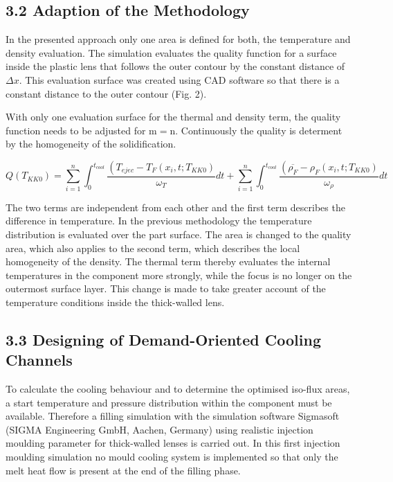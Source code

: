 \documentclass[10pt]{article}
\begin{document}
\subsection*{3.2 Adaption of the Methodology}
In the presented approach only one area is defined for both, the temperature and density evaluation. The simulation evaluates the quality function for a surface inside the plastic lens that follows the outer contour by the constant distance of $\Delta x$. This evaluation surface was created using CAD software so that there is a constant distance to the outer contour (Fig. 2).

With only one evaluation surface for the thermal and density term, the quality function needs to be adjusted for $\mathrm{m}=\mathrm{n}$. Continuously the quality is determent by the homogeneity of the solidification.


\begin{equation*}
Q\left(T_{K K 0}\right)=\sum_{i=1}^{n} \int_{0}^{t_{c o o l}} \frac{\left(T_{e j e c}-T_{F}\left(x_{i}, t ; T_{K K 0}\right)\right.}{\omega_{T}} d t+\sum_{i=1}^{n} \int_{0}^{t_{c o o l}} \frac{\left(\overline{\rho_{F}}-\rho_{F}\left(x_{i}, t ; T_{K K 0}\right)\right.}{\omega_{\rho}} d t \tag{3}
\end{equation*}


The two terms are independent from each other and the first term describes the difference in temperature. In the previous methodology the temperature distribution is evaluated over the part surface. The area is changed to the quality area, which also applies to the second term, which describes the local homogeneity of the density. The thermal term thereby evaluates the internal temperatures in the component more strongly, while the focus is no longer on the outermost surface layer. This change is made to take greater account of the temperature conditions inside the thick-walled lens.

\subsection*{3.3 Designing of Demand-Oriented Cooling Channels}
To calculate the cooling behaviour and to determine the optimised iso-flux areas, a start temperature and pressure distribution within the component must be available. Therefore a filling simulation with the simulation software Sigmasoft (SIGMA Engineering GmbH, Aachen, Germany) using realistic injection moulding parameter for thick-walled lenses is carried out. In this first injection moulding simulation no mould cooling system is implemented so that only the melt heat flow is present at the end of the filling phase.
\end{document}
